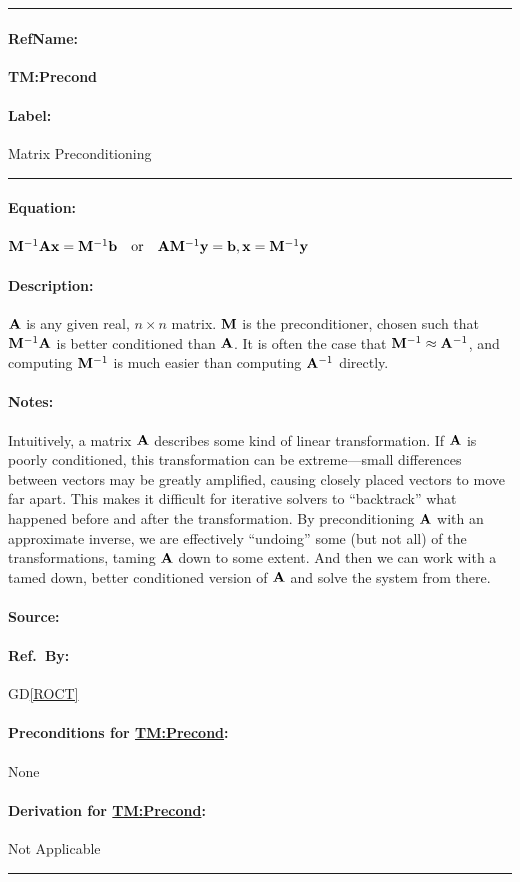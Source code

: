\documentclass[12pt]{article}
\newcommand{\dref}[1]{GD\ref{#1}}
\newcommand{\deftheory}[9][Not Applicable]
{
\newpage
\noindent \rule{\textwidth}{0.5mm}

\paragraph{RefName: } \textbf{#2} \phantomsection
\label{#2}

\paragraph{Label:} #3

\noindent \rule{\textwidth}{0.5mm}

\paragraph{Equation:}

#4

\paragraph{Description:}

#5

\paragraph{Notes:}

#6

\paragraph{Source:}

#7

\paragraph{Ref.\ By:}

#8

\paragraph{Preconditions for \hyperref[#2]{#2}:}
\label{#2_precond}

#9

\paragraph{Derivation for \hyperref[#2]{#2}:}
\label{#2_deriv}

#1

\noindent \rule{\textwidth}{0.5mm}

}
\begin{document}
\noindent
\deftheory
{TM:Precond}
{Matrix Preconditioning}
{ \(\mathbf{M}^{-1} \mathbf{A}\mathbf{x} = \mathbf{M}^{-1} \mathbf{b} \quad \text{or} \quad
  \mathbf{A}\mathbf{M}^{-1}\mathbf{y} = \mathbf{b} , \mathbf{x} = \mathbf{M}^{-1}\mathbf{y}\) }
{ \(\mathbf{A}\) is any given real, \(n \times n\) matrix. \(\mathbf{M}\) is the
  preconditioner, chosen such that \(\mathbf{M}^{-1}\mathbf{A}\) is better
  conditioned than \(\mathbf{A}\). It is often the case that \(\mathbf{M}^{-1}
  \approx \mathbf{A}^{-1}\), and computing \(\mathbf{M}^{-1}\) is much easier than
  computing \(\mathbf{A}^{-1}\) directly. }
{ Intuitively, a matrix \(\mathbf{A}\) describes some kind of linear
  transformation. If \(\mathbf{A}\) is poorly conditioned, this transformation can
  be extreme---small differences between vectors may be greatly amplified,
  causing closely placed vectors to move far apart. This makes it difficult for
  iterative solvers to ``backtrack'' what happened before and after the
  transformation. By preconditioning \(\mathbf{A}\) with an approximate inverse,
  we are effectively ``undoing'' some (but not all) of the transformations,
  taming \(\mathbf{A}\) down to some extent. And then we can work with a tamed
  down, better conditioned version of \(\mathbf{A}\) and solve the system from
  there. }
{\cite[p.~187]{ascher_first_2011}}
{\dref{ROCT}}
{None}
{}

~\newline
\end{document}
